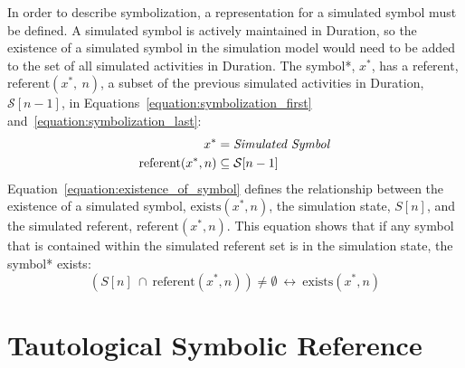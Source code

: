 In order to describe symbolization, a representation for a simulated
symbol must be defined.  A simulated symbol is actively maintained in
Duration, so the existence of a simulated symbol in the simulation
model would need to be added to the set of all simulated activities in
Duration.  The symbol*, $x^*$, has a referent,
$\text{referent}(x^*,~n)$, a subset of the previous simulated
activities in Duration, $\mathcal{S}[n-1]$, in
Equations~\ref{equation:symbolization_first}
and~\ref{equation:symbolization_last}:
\begin{align}
\label{equation:symbolization_first}
                    x^* &= \text{\emph{Simulated Symbol}} \\
\label{equation:symbolization_last}
\text{referent}(x^*, n) &\subseteq \mathcal{S}[n-1]
\end{align}
Equation~\ref{equation:existence_of_symbol} defines the relationship
between the existence of a simulated symbol, $\text{exists}(x^*, n)$,
the simulation state, $S[n]$, and the simulated referent,
$\text{referent}(x^*, n)$.  This equation shows that if any symbol
that is contained within the simulated referent set is in the
simulation state, the symbol* exists:
\begin{equation}
\label{equation:existence_of_symbol}
(S[n] ~{\cap}~ \text{referent}(x^*, n)) \neq \emptyset ~\longleftrightarrow~ \text{exists}(x^*, n)
\end{equation}

\section{Tautological Symbolic Reference}

